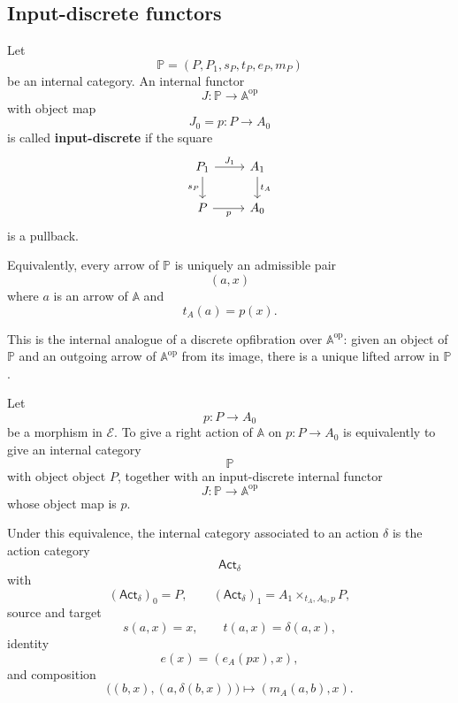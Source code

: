 \subsection{Input-discrete functors}

\begin{definition}
\label{def:input-discrete-functor}
Let
\[
\mathbb P=(P,P_1,s_P,t_P,e_P,m_P)
\]
be an internal category. An internal functor
\[
J:\mathbb P\to\mathbb A^{\mathrm{op}}
\]
with object map
\[
J_0=p:P\to A_0
\]
is called \textbf{input-discrete} if the square
\[
\begin{tikzcd}
P_1 \arrow[r, "J_1"] \arrow[d, "s_P"']
&
A_1 \arrow[d, "t_A"]
\\
P \arrow[r, "p"']
&
A_0
\end{tikzcd}
\]
is a pullback.

Equivalently, every arrow of \(\mathbb P\) is uniquely an admissible pair
\[
(a,x)
\]
where \(a\) is an arrow of \(\mathbb A\) and
\[
t_A(a)=p(x).
\]
\end{definition}

This is the internal analogue of a discrete opfibration over \(\mathbb A^{\mathrm{op}}\): given an object of \(\mathbb P\) and an outgoing arrow of \(\mathbb A^{\mathrm{op}}\) from its image, there is a unique lifted arrow in \(\mathbb P\).

\begin{theorem}
\label{thm:actions-as-input-discrete-functors}
Let
\[
p:P\to A_0
\]
be a morphism in \(\mathcal E\). To give a right action of \(\mathbb A\) on \(p:P\to A_0\) is equivalently to give an internal category
\[
\mathbb P
\]
with object object \(P\), together with an input-discrete internal functor
\[
J:\mathbb P\to\mathbb A^{\mathrm{op}}
\]
whose object map is \(p\).

Under this equivalence, the internal category associated to an action \(\delta\) is the action category
\[
\mathsf{Act}_\delta
\]
with
\[
(\mathsf{Act}_\delta)_0=P,
\qquad
(\mathsf{Act}_\delta)_1=A_1\times_{t_A,A_0,p}P,
\]
source and target
\[
s(a,x)=x,
\qquad
t(a,x)=\delta(a,x),
\]
identity
\[
e(x)=(e_A(px),x),
\]
and composition
\[
\bigl((b,x),(a,\delta(b,x))\bigr)
\longmapsto
(m_A(a,b),x).
\]
\end{theorem}

